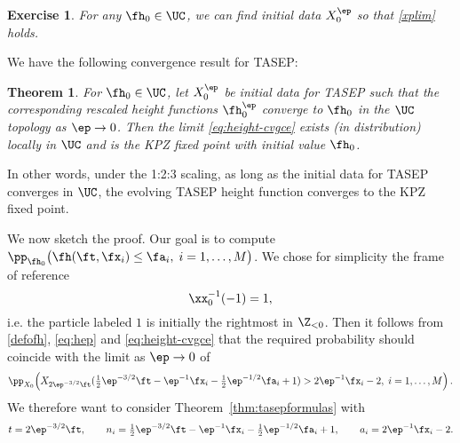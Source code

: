\documentclass[]{pcmi}
\theoremstyle{plain}
\newtheorem{theorem}[equation]{Theorem}
\newtheorem{exercise}[equation]{Exercise}
\theoremstyle{definition}
\begin{document}
\begin{exercise} 
For any $\fh_0\in \UC$, we can find  initial data $X^\ep_0$  so that \eqref{xplim} holds.
\end{exercise}

\noindent We have the following convergence result for TASEP:

\begin{theorem}\label{thm:fullfixedpt}
For $\fh_0\in\UC$, let $X_0^\ep$ be initial data for TASEP such that the corresponding rescaled height functions $\fh_0^\ep$ converge to $\fh_0$ in the $\UC$ topology as $\ep\to0$.
Then the limit \eqref{eq:height-cvgce} exists (in distribution) locally in $\UC$ and is the KPZ fixed point with initial value $\fh_0$.
\end{theorem}

In other words, under the 1:2:3 scaling, as long as the initial data for TASEP converges in $\UC$, the evolving TASEP height function converges to the KPZ fixed point.

We now sketch the proof.  Our goal is to  compute $\pp_{\fh_0} \bigl(\fh(\ft,\fx_i)\leq \fa_i,\;i=1,\ldots,M\bigr)$. We chose for simplicity the frame of reference
\begin{equation}\label{eq:x0conv} 
  \xx_0^{-1}(-1)=1,
\end{equation}
i.e. the particle labeled $1$ is initially the rightmost in $\Z_{<0}$. Then it follows from \eqref{defofh}, \eqref{eq:hep} and \eqref{eq:height-cvgce} that the required probability should coincide with the limit as $\ep\to 0$ of
\begin{equation}\label{eq:TASEPtofp}
	\pp_{X_0}\!\left(X_{2\ep^{-3/2}\ft}(\tfrac12\ep^{-3/2}\ft-\ep^{-1}\fx_i-\tfrac12\ep^{-1/2}\fa_i+1)>2\ep^{-1}\fx_i-2,\;i=1,\ldots,M\right).
\end{equation}
We therefore want to consider Theorem~\ref{thm:tasepformulas} with 
\begin{equation}\label{eq:KPZscaling}
t=2\ep^{-3/2}\ft,\qquad  n_i = \tfrac{1}{2}\ep^{-3/2}\ft-\ep^{-1}\fx_i-\tfrac12\ep^{-1/2}\fa_i+1,\qquad a_i=2\ep^{-1}\fx_i-2.
\end{equation}
\end{document}
